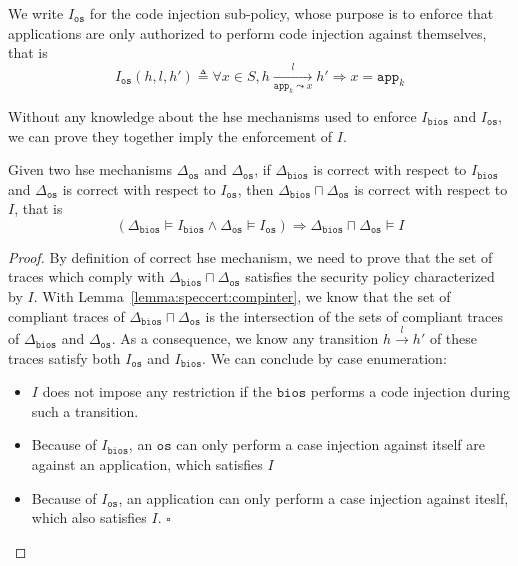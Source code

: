 \begin{definition}
  \label{def:speccert:ospol}

  We write $I_{\mathtt{os}}$ for the code injection sub-policy, whose purpose is
  to enforce that applications are only authorized to perform code injection
  against themselves, that is
  \[
    I_\mathtt{os}(h, l, h') \triangleq \forall x \in S, h
    \xrightarrow[\mathtt{app}_k \leadsto x]{l} h' \Rightarrow x = \mathtt{app}_k
  \]
\end{definition}

Without any knowledge about the \ac{hse} mechanisms used to enforce
\( I_{\mathtt{bios}} \) and \( I_{\mathtt{os}} \), we can prove they together
imply the enforcement of \( I \).

\begin{theorem}
  Given two \ac{hse} mechanisms \( \Delta_{\mathtt{os}} \) and
  \( \Delta_{\mathtt{os}} \), if \( \Delta_{\mathtt{bios}} \) is correct with
  respect to \( I_{\mathtt{bios}} \) and \( \Delta_{\mathtt{os}} \) is correct
  with respect to \( I_{\mathtt{os}} \), then
  \( \Delta_{\mathtt{bios}} \sqcap \Delta_{\mathtt{os}} \) is correct with
  respect to \( I \), that is
  \[
    (\Delta_{\mathtt{bios}} \models I_{\mathtt{bios}} \wedge
    \Delta_{\mathtt{os}} \models I_{\mathtt{os}}) \Rightarrow
    \Delta_{\mathtt{bios}} \sqcap \Delta_{\mathtt{os}} \models I
  \]

  \begin{proof}
    By definition of correct \ac{hse} mechanism, we need to prove that the set
    of traces which comply with
    \( \Delta_{\mathtt{bios}} \sqcap \Delta_{\mathtt{os}} \) satisfies the
    security policy characterized by \( I \).
    With Lemma~\ref{lemma:speccert:compinter}, we know that the set of compliant
    traces of \( \Delta_{\mathtt{bios}} \sqcap \Delta_{\mathtt{os}} \) is the
    intersection of the sets of compliant traces of \( \Delta_{\mathtt{bios}} \)
    and \( \Delta_{\mathtt{os}} \).
    As a consequence, we know any transition \( h \xrightarrow{l} h' \) of these
    traces satisfy both \( I_{\mathtt{os}} \) and \( I_{\mathtt{bios}} \).
    We can conclude by case enumeration:
    \begin{itemize}
    \item \( I \) does not impose any restriction if the \( \mathtt{bios} \)
      performs a code injection during such a transition.
    \item Because of \( I_{\mathtt{bios}} \), an \( \mathtt{os} \) can only
      perform a case injection against itself are against an application, which
      satisfies \( I \)
    \item Because of \( I_{\mathtt{os}} \), an application can only perform a
      case injection against iteslf, which also satisfies \( I \). \hfill
      \( \square \)
    \end{itemize}
  \end{proof}
\end{theorem}

